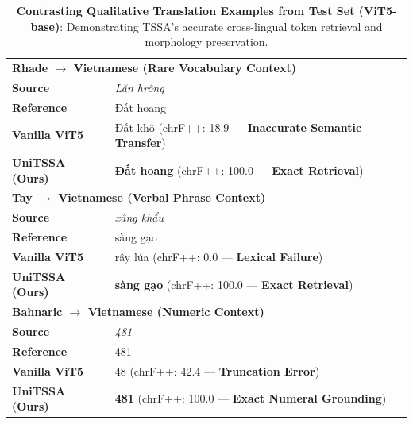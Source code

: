 \begin{table}[t]
\centering\small
\caption{\textbf{Contrasting Qualitative Translation Examples from Test Set (ViT5-base)}: Demonstrating TSSA's accurate cross-lingual token retrieval and morphology preservation.}
\label{tab:qualitative_vit5}
\vspace{4pt}
\begin{tabular}{lp{}}
\toprule
\multicolumn{2}{l}{\textbf{Rhade $\rightarrow$ Vietnamese (Rare Vocabulary Context)}} \\
\textbf{Source} & \textit{Lăn hrông} \\
\textbf{Reference} & Đất hoang \\
\textbf{Vanilla ViT5} & \textcolor{BrickRed}{Đất khô (chrF++: 18.9 --- \textbf{Inaccurate Semantic Transfer})} \\
\textbf{UniTSSA (Ours)} & \textcolor{topgreen}{\textbf{Đất hoang} (chrF++: 100.0 --- \textbf{Exact Retrieval})} \\
\midrule
\multicolumn{2}{l}{\textbf{Tay $\rightarrow$ Vietnamese (Verbal Phrase Context)}} \\
\textbf{Source} & \textit{xâng khẩu} \\
\textbf{Reference} & sàng gạo \\
\textbf{Vanilla ViT5} & \textcolor{BrickRed}{rây lúa (chrF++: 0.0 --- \textbf{Lexical Failure})} \\
\textbf{UniTSSA (Ours)} & \textcolor{topgreen}{\textbf{sàng gạo} (chrF++: 100.0 --- \textbf{Exact Retrieval})} \\
\midrule
\multicolumn{2}{l}{\textbf{Bahnaric $\rightarrow$ Vietnamese (Numeric Context)}} \\
\textbf{Source} & \textit{481} \\
\textbf{Reference} & 481 \\
\textbf{Vanilla ViT5} & \textcolor{BrickRed}{48 (chrF++: 42.4 --- \textbf{Truncation Error})} \\
\textbf{UniTSSA (Ours)} & \textcolor{topgreen}{\textbf{481} (chrF++: 100.0 --- \textbf{Exact Numeral Grounding})} \\
\bottomrule
\end{tabular}
\end{table}
